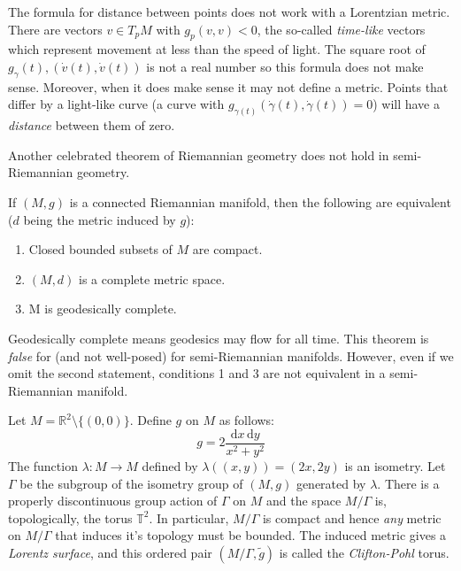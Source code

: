 \documentclass{beamer}
\begin{document}
    \begin{frame}
        The formula for distance between points does not work with a Lorentzian
        metric. There are vectors $v\in{T}_{p}M$ with
        $g_{p}(v,v)<0$, the so-called \textit{time-like} vectors which
        represent movement at less than the speed of light. The square root of
        $g_{\gamma}(t),(\dot{v}(t),\dot{v}(t))$ is not a real number so this formula
        does not make sense. Moreover, when it does make sense it may not define
        a metric. Points that differ by a light-like curve (a curve with
        $g_{\gamma(t)}(\dot{\gamma}(t),\dot{\gamma}(t))=0$) will have a
        \textit{distance} between them of zero.
    \end{frame}
    \begin{frame}
        Another celebrated theorem of Riemannian geometry does not hold in
        semi-Riemannian geometry.
        \begin{theorem}
            If $(M,g)$ is a connected Riemannian manifold, then the following
            are equivalent ($d$ being the metric induced by $g$):
            \begin{enumerate}
                \item Closed bounded subsets of $M$ are compact.
                \item $(M,d)$ is a complete metric space.
                \item M is geodesically complete.
            \end{enumerate}
        \end{theorem}
        Geodesically complete means geodesics may flow for all time. This
        theorem is \textit{false} for (and not well-posed) for semi-Riemannian
        manifolds. However, even if we omit the second statement, conditions
        1 and 3 are not equivalent in a semi-Riemannian manifold.
    \end{frame}
    \begin{frame}
        Let $M=\mathbb{R}^{2}\setminus\{(0,0)\}$. Define $g$ on $M$ as follows:
        \begin{equation}
            g=2\frac{\textrm{d}x\,\textrm{d}y}{x^{2}+y^{2}}
        \end{equation}
        The function $\lambda:M\rightarrow{M}$ defined by
        $\lambda((x,y))=(2x,2y)$ is an isometry. Let $\Gamma$ be the subgroup
        of the isometry group of $(M,g)$ generated by $\lambda$. There is a
        properly discontinuous group action of $\Gamma$ on $M$ and the space
        $M/\Gamma$ is, topologically, the torus $\mathbb{T}^{2}$. In particular,
        $M/\Gamma$ is compact and hence \textit{any} metric on $M/\Gamma$ that
        induces it's topology must be bounded. The induced metric gives a
        \textit{Lorentz surface}, and this ordered pair
        $(M/\Gamma,\tilde{g})$ is called the
        \textit{Clifton-Pohl} torus.
    \end{frame}
\end{document}
